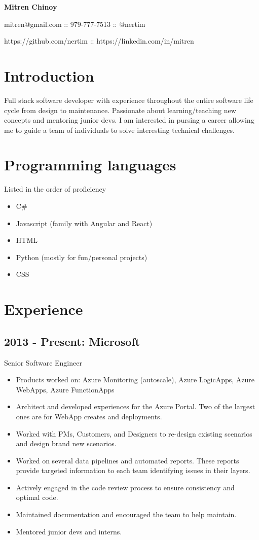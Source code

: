 \documentclass[11pt]{article}
\begin{document}
    \centerline{\textbf{\huge Mitren Chinoy}}
    \centerline{\large mitren@gmail.com :: 979-777-7513 :: @nertim}
    \centerline{\large https://github.com/nertim :: https://linkedin.com/in/mitren}


    \section*{Introduction}

        Full stack software developer with experience throughout the entire software life cycle from design to maintenance. Passionate about learning/teaching new concepts and mentoring junior devs. I am interested in pursing a career allowing me to guide a team of individuals to solve interesting technical challenges.

    \section*{Programming languages}
    Listed in the order of proficiency
        \begin{itemize}
            \item C\#
            \item Javascript (family with Angular and React)
            \item HTML
            \item Python (mostly for fun/personal projects)
            \item CSS
        \end{itemize}

    \section*{Experience}

        \subsection*{2013 - Present: Microsoft}
            Senior Software Engineer
            \begin{itemize}
                \item Products worked on: Azure Monitoring (autoscale), Azure LogicApps, Azure WebApps, Azure FunctionApps
                \item Architect and developed experiences for the Azure Portal. Two of the largest ones are for WebApp creates and deployments.
                \item Worked with PMs, Customers, and Designers to re-design existing scenarios and design brand new scenarios. 
                \item Worked on several data pipelines and automated reports. These reports provide targeted information to each team identifying issues in their layers. 
                \item Actively engaged in the code review process to ensure consistency and optimal code.
                \item Maintained documentation and encouraged the team to help maintain.
                \item Mentored junior devs and interns.
            \end{itemize}
\end{document}
